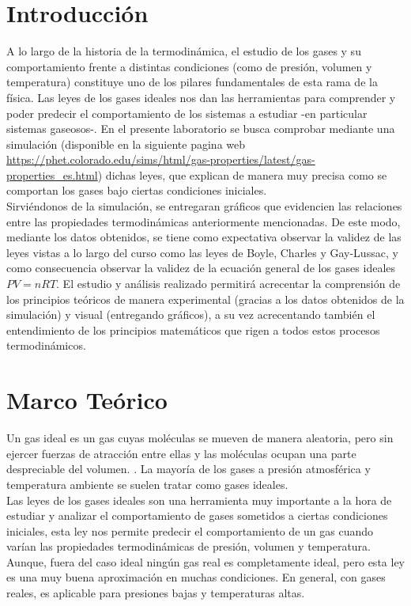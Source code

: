 \documentclass[12pt]{article}
\begin{document}
\section*{Introducción}
A lo largo de la historia de la termodinámica, el estudio de los gases y 
su comportamiento frente a distintas condiciones (como de presión, 
volumen y temperatura) constituye uno de los pilares fundamentales de 
esta rama de la física. Las leyes de los gases ideales nos dan las 
herramientas para comprender y poder predecir el comportamiento de los 
sistemas a estudiar -en particular sistemas gaseosos-.  En el presente 
laboratorio se busca comprobar mediante una simulación (disponible en la 
siguiente pagina web \url{https://phet.colorado.edu/sims/html/gas-properties/latest/gas-properties_es.html}) 
dichas leyes, que explican de manera muy precisa como se comportan los 
gases bajo ciertas condiciones iniciales. \\

Sirviéndonos de la simulación, se entregaran gráficos que evidencien las 
relaciones entre las propiedades termodinámicas anteriormente mencionadas.
De este modo, mediante los datos obtenidos, se tiene como expectativa 
observar la validez de las leyes vistas a lo largo del curso como las 
leyes de Boyle, Charles y Gay-Lussac, y como consecuencia observar la 
validez de la ecuación general de los gases ideales $PV=nRT$. El estudio 
y análisis realizado permitirá  acrecentar la comprensión de los 
principios teóricos de manera experimental (gracias a los datos obtenidos 
de la simulación) y visual (entregando gráficos), a su vez acrecentando 
también el entendimiento de los principios matemáticos que rigen a todos 
estos procesos termodinámicos.

\section*{Marco Teórico}
Un gas ideal es un gas cuyas moléculas se mueven de manera aleatoria, pero sin ejercer fuerzas de atracción entre ellas y las moléculas ocupan una parte despreciable del volumen. \parencite{condetema}. La mayoría de los gases a presión atmosférica y temperatura ambiente se suelen tratar como gases ideales. \\

Las leyes de los gases ideales son una herramienta muy importante a la 
hora de estudiar y analizar el comportamiento de gases sometidos a ciertas 
condiciones iniciales, esta ley nos permite predecir el comportamiento de un gas cuando varían las propiedades termodinámicas de presión, volumen y temperatura. Aunque, fuera del caso ideal ningún gas real es completamente ideal, pero esta ley es una muy buena aproximación en muchas condiciones. En general, con gases reales, es aplicable para presiones bajas y temperaturas altas. \\
\end{document}
